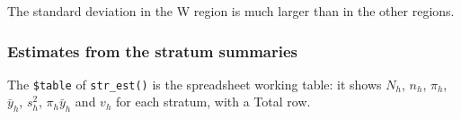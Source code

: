 \documentclass[
  letterpaper,
  DIV=11,
  numbers=noendperiod]{scrreprt}
\newenvironment{Shaded}{\begin{snugshade}}{\end{snugshade}}
\newcommand{\AttributeTok}[1]{\textcolor[rgb]{0.40,0.45,0.13}{#1}}
\newcommand{\FunctionTok}[1]{\textcolor[rgb]{0.28,0.35,0.67}{#1}}
\newcommand{\NormalTok}[1]{\textcolor[rgb]{0.00,0.23,0.31}{#1}}
\newcommand{\OtherTok}[1]{\textcolor[rgb]{0.00,0.23,0.31}{#1}}
\newcommand{\SpecialCharTok}[1]{\textcolor[rgb]{0.37,0.37,0.37}{#1}}
\newcommand{\StringTok}[1]{\textcolor[rgb]{0.13,0.47,0.30}{#1}}
\renewcommand{\[}{\begin{equation}}
\renewcommand{\]}{\end{equation}}
\begin{document}
The standard deviation in the W region is much larger than in the other
regions.

\subsubsection*{Estimates from the stratum
summaries}\label{estimates-from-the-stratum-summaries}

The \texttt{\$table} of \texttt{str\_est()} is the spreadsheet working
table: it shows \(N_h\), \(n_h\), \(\pi_h\), \(\bar y_h\), \(s_h^2\),
\(\pi_h\bar y_h\) and \(v_h\) for each stratum, with a Total row.

\begin{Shaded}
\end{Shaded}
\end{document}
